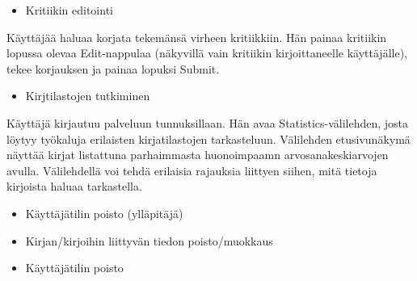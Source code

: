 \documentclass[11pt,oneside,article]{memoir}
\begin{document}
\begin{itemize}
\item Kritiikin editointi
\end{itemize}
Käyttäjää haluaa korjata tekemänsä virheen kritiikkiin. Hän painaa kritiikin lopussa olevaa Edit-nappulaa (näkyvillä vain kritiikin kirjoittaneelle käyttäjälle), tekee korjauksen ja painaa lopuksi Submit.

\begin{itemize}
\item Kirjtilastojen tutkiminen
\end{itemize}
Käyttäjä kirjautuu palveluun tunnuksillaan. Hän avaa Statistics-välilehden, josta löytyy työkaluja erilaisten kirjatilastojen tarkasteluun. Välilehden etusivunäkymä näyttää kirjat listattuna parhaimmasta huonoimpaamn arvosanakeskiarvojen avulla. Välilehdellä voi tehdä erilaisia rajauksia liittyen siihen, mitä tietoja kirjoista haluaa tarkastella.

\begin{itemize}
\item Käyttäjätilin poisto (ylläpitäjä)
\item Kirjan/kirjoihin liittyvän tiedon poisto/muokkaus
\item Käyttäjätilin poisto
\end{itemize}
\end{document}
